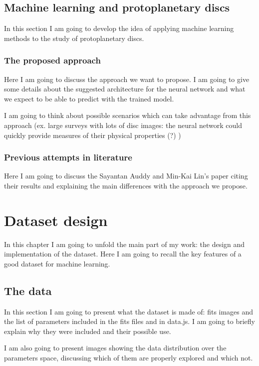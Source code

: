 \documentclass[a4paper,10pt]{report}
\begin{document}
\section{Machine learning and protoplanetary discs}

In this section I am going to develop the idea of applying machine learning methods to the  study of protoplanetary
discs.

\subsection{The proposed approach}

Here I am going to discuss the approach we want to propose.
 I am going to give some details about the 
suggested architecture for the neural network and what 
we expect to be able to predict with the trained
model.

I am going to think about possible scenarios which can take advantage from this approach
(ex. large surveys with lots of disc images: the neural network 
could quickly provide measures of their physical properties (?) )

\subsection{Previous attempts in literature}

Here I am going to discuss the Sayantan Auddy and Min-Kai Lin's paper citing their results
and explaining the main differences with the approach we propose.

\chapter{Dataset design}

In this chapter I am going to unfold the main part of my work: the design and implementation of the dataset.
Here I am going to recall the key features of a good dataset for machine learning.

\section{The data}

In this section I am going to present what the dataset is made of: fits images and the list of parameters included in the fits files 
and in data.js. I am going to briefly explain why they were included and their possible use.

I am also going to present images showing the data distribution over the parameters space, discussing
 which of them are properly explored and which not.
\end{document}
